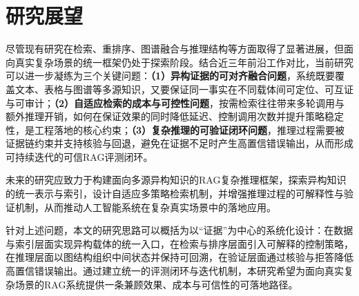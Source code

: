 \section{研究展望}

尽管现有研究在检索、重排序、图谱融合与推理结构等方面取得了显著进展，但面向真实复杂场景的统一框架仍处于探索阶段。结合近三年前沿工作对比，当前研究可以进一步凝练为三个关键问题：\textbf{（1）异构证据的可对齐融合问题}，系统既要覆盖文本、表格与图谱等多源知识，又要保证同一事实在不同载体间可定位、可互证与可审计；\textbf{（2）自适应检索的成本与可控性问题}，按需检索往往带来多轮调用与额外推理开销，如何在保证效果的同时降低延迟、控制调用次数并提升策略稳定性，是工程落地的核心约束；\textbf{（3）复杂推理的可验证闭环问题}，推理过程需要被证据链约束并支持核验与回退，避免在证据不足时产生高置信错误输出，从而形成可持续迭代的可信RAG评测闭环。

未来的研究应致力于构建面向多源异构知识的RAG复杂推理框架，探索异构知识的统一表示与索引，设计自适应多策略检索机制，并增强推理过程的可解释性与验证机制，从而推动人工智能系统在复杂真实场景中的落地应用。

针对上述问题，本文的研究思路可以概括为以“证据”为中心的系统化设计：在数据与索引层面实现异构载体的统一入口，在检索与排序层面引入可解释的控制策略，在推理层面以图结构组织中间状态并保持可回溯，在验证层面通过核验与拒答降低高置信错误输出。通过建立统一的评测闭环与迭代机制，本研究希望为面向真实复杂场景的RAG系统提供一条兼顾效果、成本与可信性的可落地路径。

\newpage
\begingroup
    \printbibliography[title={参考文献}]
\endgroup
